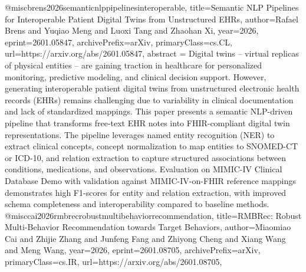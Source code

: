 {}@misc{brens2026semanticnlppipelinesinteroperable,
      title={Semantic NLP Pipelines for Interoperable Patient Digital Twins from Unstructured EHRs}, 
      author={Rafael Brens and Yuqiao Meng and Luoxi Tang and Zhaohan Xi},
      year={2026},
      eprint={2601.05847},
      archivePrefix={arXiv},
      primaryClass={cs.CL},
      url={https://arxiv.org/abs/2601.05847},
      abstract = {Digital twins -- virtual replicas of physical entities -- are gaining traction in healthcare for personalized monitoring, predictive modeling, and clinical decision support. However, generating interoperable patient digital twins from unstructured electronic health records (EHRs) remains challenging due to variability in clinical documentation and lack of standardized mappings. This paper presents a semantic NLP-driven pipeline that transforms free-text EHR notes into FHIR-compliant digital twin representations. The pipeline leverages named entity recognition (NER) to extract clinical concepts, concept normalization to map entities to SNOMED-CT or ICD-10, and relation extraction to capture structured associations between conditions, medications, and observations. Evaluation on MIMIC-IV Clinical Database Demo with validation against MIMIC-IV-on-FHIR reference mappings demonstrates high F1-scores for entity and relation extraction, with improved schema completeness and interoperability compared to baseline methods.}
}@misc{cai2026rmbrecrobustmultibehaviorrecommendation,
      title={RMBRec: Robust Multi-Behavior Recommendation towards Target Behaviors}, 
      author={Miaomiao Cai and Zhijie Zhang and Junfeng Fang and Zhiyong Cheng and Xiang Wang and Meng Wang},
      year={2026},
      eprint={2601.08705},
      archivePrefix={arXiv},
      primaryClass={cs.IR},
      url={https://arxiv.org/abs/2601.08705},
}
